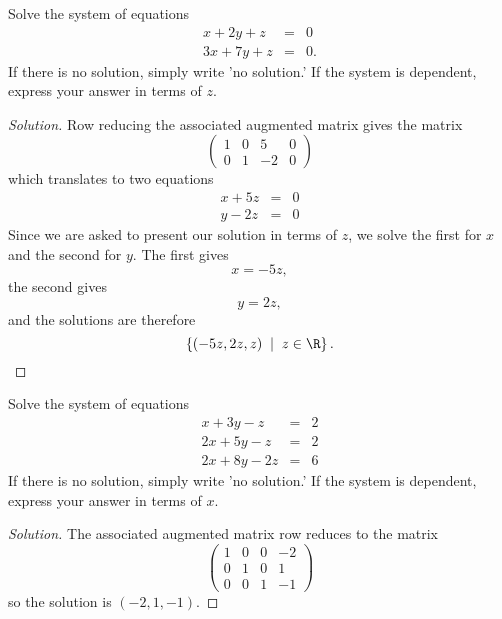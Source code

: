 \documentclass[12pt]{amsart}
\begin{document}
\newpage
\begin{thm}[15 Points]\label{ex2}
  Solve the system of equations
  \begin{eqnarray*}
    x + 2y + z &=& 0\\
    3x + 7y + z &=& 0.
  \end{eqnarray*}
  If there is no solution, simply write 'no solution.'  If the system is dependent, express your answer in terms of $z$.
  \begin{proof}[Solution]
    Row reducing the associated augmented matrix gives the matrix
    $$\left(\begin{array}{cccc}
      1 & 0 & 5 & 0\\
      0 & 1 & -2 & 0
    \end{array}\right)$$
    which translates to two equations
    \begin{eqnarray*}
      x + 5z &=& 0\\
      y - 2z &=& 0
    \end{eqnarray*}
    Since we are asked to present our solution in terms of $z$, we solve the first for $x$ and the second for $y$.
    The first gives
    $$x = -5z,$$
    the second gives
    $$y = 2z,$$
    and the solutions are therefore
    $$\left\{(-5z, 2z, z) \;\mid\; z \in \R\right\}.$$
  \end{proof}
\end{thm}

\newpage

\begin{thm}[15 Points]\label{ex3}
  Solve the system of equations
  \begin{eqnarray*}
    x + 3y - z &=& 2\\
    2x + 5y - z &=& 2\\
    2x + 8y - 2z &=& 6
  \end{eqnarray*}
  If there is no solution, simply write 'no solution.'  If the system is dependent, express your answer in terms of $x$.
  \begin{proof}[Solution]
    The associated augmented matrix row reduces to the matrix
    $$\left(\begin{array}{cccc}
      1 & 0 & 0 & -2\\
      0 & 1 & 0 & 1\\
      0 & 0 & 1 & -1
    \end{array}\right)$$
    so the solution is $(-2,1,-1)$.
  \end{proof}
\end{thm}
\end{document}
